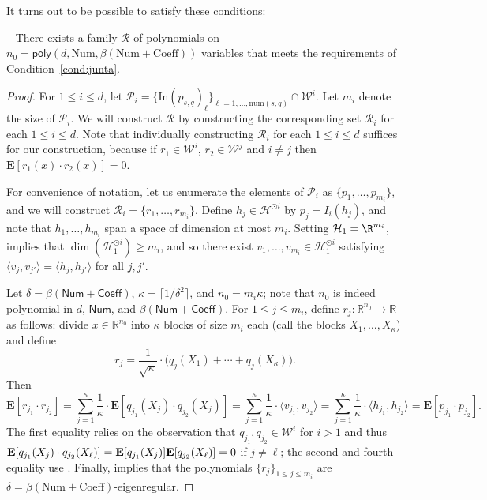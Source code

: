 \documentclass{toc}
\newcommand{\E}{{\bf E}}
\newcommand{\Inner}{\mathrm{In}}
\newcommand{\num}{\mathrm{num}}
\newcommand{\inr}[2]{\langle #1, #2 \rangle}
\newcommand{\Coeff}{\mathsf{Coeff}}
\newcommand{\Num}{\mathsf{Num}}
\begin{document}
It turns out to be possible to satisfy these conditions:
\begin{lemma}~\label{lem:junta-construct}
There exists a family $\mathcal{R}$ of polynomials on
$n_0= \mathsf{poly}(d, \mathrm{Num}, \beta(\mathrm{Num} + \mathrm{Coeff}))$ variables that
meets the requirements of Condition~\ref{cond:junta}.
\end{lemma}

\begin{proof}
For $1 \le i \le d$, let $\mathcal{P}_i = \{\Inner(p_{s,q})_\ell\}_{\ell =
1,\dots, \num({s,q})} \cap  \mathcal{W}^i$. Let $m_i$ denote the size of
$\mathcal{P}_i$. We will construct $\mathcal{R}$ by constructing the
corresponding set $\mathcal{R}_i$ for each $1 \le i \le d$. Note that
individually constructing $\mathcal{R}_i $ for each $1 \le i \le d$ suffices
for our construction, because if $r_1 \in \mathcal{W}^i$, $r_2 \in
\mathcal{W}^j$ and $i \neq j$ then $\mathbf{E}[r_1(x) \cdot r_2(x)]=0$. 

For convenience of notation, let us enumerate the elements of $\mathcal{P}_i$
as $\{p_1, \ldots, p_{m_i}\}$, and we will construct $\mathcal{R}_i = \{r_1,
\ldots, r_{m_i}\}$. Define $h_j \in \mathcal{H}^{\odot i}$ by $p_j = I_i(h_j)$,
and note that $h_1, \dots, h_{m_i}$ span a space of dimension at most $m_i$.
Setting $\mathcal{H}_1 = \R^{m_i}$,  implies
that $\dim(\mathcal{H}_1^{\odot i}) \ge m_i$, and so there exist
$v_1,\dots, v_{m_i} \in \mathcal{H}_1^{\odot i}$ satisfying $\inr{v_j}{v_{j'}}
= \inr{h_j}{h_{j'}}$ for all $j, j'$.

Let $\delta = \beta(\Num + \Coeff)$, $\kappa = \lceil 1/\delta^2 \rceil$, and $n_0 = m_i \kappa$;
note that $n_0$ is indeed polynomial in $d$, $\Num$, and $\beta(\Num + \Coeff)$.
For $1 \le j \le m_i$, define
$r_j: \mathbb{R}^{n_0} \rightarrow \mathbb{R}$ as follows: divide $x \in
\mathbb{R}^{n_0}$ into $\kappa$ blocks of size $m_i$ each (call the blocks $X_1,
\ldots, X_{\kappa}$) and define
\[
r_j = \frac{1}{\sqrt{\kappa}} \cdot \big( q_{j}(X_1) + \cdots  + q_{j}(X_\kappa)\big). 
\]
Then
\[
\mathbf{E}[r_{j_1} \cdot r_{j_2}] = \sum_{j=1}^\kappa \frac{1}{\kappa} \cdot  \mathbf{E}[q_{j_1}(X_j) \cdot q_{j_2}(X_j)] = \sum_{j=1}^\kappa \frac{1}{\kappa} \cdot \langle v_{j_1}, v_{j_2} \rangle=\sum_{j=1}^\kappa \frac{1}{\kappa} \cdot \langle h_{j_1}, h_{j_2} \rangle = \mathbf{E} [p_{j_1} \cdot p_{j_2}].
\]
The first equality relies on the observation that $q_{j_1}, q_{j_2} \in
\mathcal{W}^{i}$ for $i>1$ and thus $\mathbf{E}[q_{j_1}(X_j) \cdot
q_{j_2}(X_\ell)]= \E[q_{j_1}(X_j)] \E [q_{j_2}(X_\ell)] = 0$ if $j \neq \ell$;
the second and fourth equality use .
Finally,  implies that the polynomials $\{r_{j}\}_{1 \le
j \le m_i}$ are $\delta = \beta(\mathrm{Num} + \mathrm{Coeff})$-eigenregular. 
\end{proof}
\end{document}
